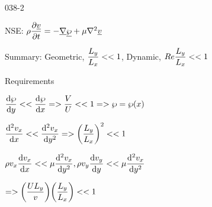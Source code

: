 \begin{mitframe} {038-2}
\begin{listone}
	\item NSE: $\dens\dfrac{\partial\uline{\vvel}}{\partial{t}}=-\gradop\uline{\dynpress}+\chempot\nabla^2\uline{\vvel}$
			\begin{listtwo}
				\item Summary: Geometric, $\dfrac{\length_{y}}{\length_{\disp}}<< 1$,  Dynamic, $\reynolds\dfrac{\length_{y}}{\length_{\disp}}<< 1$ 
				\item Requirements        
               		\begin{listthree}
        		        \item $\dfrac{\mathrm{d}\dynpress}{\mathrm{d}y}<<\dfrac{\mathrm{d}\dynpress}{\mathrm{d}\disp}=>\dfrac{\vol}{\intenergy}<< 1=> \dynpress=\dynpress(\disp)$
						\item $\dfrac{\mathrm{d}^{2}\vvel_{\disp}}{\mathrm{d}\disp}<<\dfrac{\mathrm{d}^{2}\vvel_{\disp}}{\mathrm{d}y^{2}}=>\bigg(\dfrac{\length_{y}}{\length_{\disp}}\bigg)^2 << 1$
                         \item$\dens\vvel_{\disp}\dfrac{\mathrm{d}\vvel_{\disp}}{\mathrm{d}\disp}<<\chempot\dfrac{\mathrm{d}^2\vvel_{\disp}}{\mathrm{d}y^2}, \dens\vvel_y\dfrac{\mathrm{d}\vvel_y}{\mathrm{d}y}<<\chempot\dfrac{\mathrm{d}^2\vvel_{\disp}}{\mathrm{d}y^2}$
                			\begin{listfour}
                                    \item $=>\bigg(\dfrac{\intenergy\length_y}{\vvel}\bigg)\bigg(\dfrac{\length_y}{\length_{\disp}}\bigg)<< 1$
                  		\end{listfour}
				\end{listthree}
		\end{listtwo}
\end{listone}
\end{mitframe}